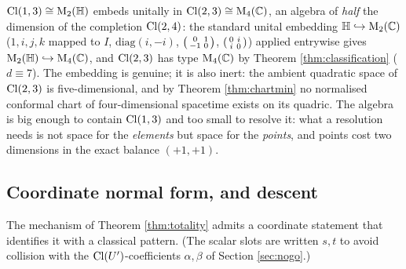 \begin{example}\label{ex:exotic}
$\mathrm{Cl}(1,3) \cong \mathrm{M}_2(\mathbb{H})$ embeds unitally in $\mathrm{Cl}(2,3) \cong \mathrm{M}_4(\mathbb{C})$, an algebra of \emph{half} the dimension of the completion $\mathrm{Cl}(2,4)$: the standard unital embedding $\mathbb{H} \hookrightarrow \mathrm{M}_2(\mathbb{C})$ ($1, i, j, k$ mapped to $I$, $\mathrm{diag}(i, -i)$, $\begin{psmallmatrix}0&1\\-1&0\end{psmallmatrix}$, $\begin{psmallmatrix}0&i\\i&0\end{psmallmatrix}$) applied entrywise gives $\mathrm{M}_2(\mathbb{H}) \hookrightarrow \mathrm{M}_4(\mathbb{C})$, and $\mathrm{Cl}(2,3)$ has type $\mathrm{M}_4(\mathbb{C})$ by Theorem \ref{thm:classification} ($d \equiv 7$). The embedding is genuine; it is also inert: the ambient quadratic space of $\mathrm{Cl}(2,3)$ is five-dimensional, and by Theorem \ref{thm:chartmin} no normalised conformal chart of four-dimensional spacetime exists on its quadric. The algebra is big enough to contain $\mathrm{Cl}(1,3)$ and too small to resolve it: what a resolution needs is not space for the \emph{elements} but space for the \emph{points}, and points cost two dimensions in the exact balance $(+1,+1)$.
\end{example}

\subsection{Coordinate normal form, and descent}\label{sec:swap}

The mechanism of Theorem \ref{thm:totality} admits a coordinate statement that identifies it with a classical pattern. (The scalar slots are written $s, t$ to avoid collision with the $\mathrm{Cl}(U')$-coefficients $\alpha, \beta$ of Section \ref{sec:nogo}.)

